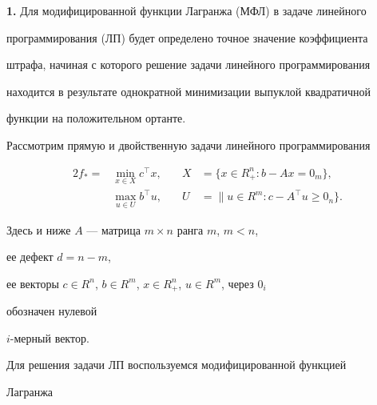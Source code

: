 \pagestyle{plain} %













\maketitle








{\bf 1.} Для модифицированной функции Лагранжа (МФЛ) в задаче линейного


программирования (ЛП) будет определено точное значение коэффициента


штрафа, начиная с которого решение задачи линейного программирования


находится в результате однократной минимизации выпуклой квадратичной


функции на положительном ортанте.





Рассмотрим прямую и двойственную задачи линейного программирования


\begin{alignat}{2}


f_*=& \min_{x\in X}c^\top x, &\quad X&=\{x\in R^n_+ :


b-Ax=0_m\},\\


& \max_{u\in U}b^\top u, &\quad U&=\|u\in R^m :


c-A^\top u\ge 0_n\}.


\end{alignat}


Здесь и ниже $A$ --- матрица $m\times n$ ранга $m$, $m<n$,


ее дефект $d=n-m$,


ее векторы $c\in R^n$, $b\in R^m$, $x\in R^n_+$, $u\in R^m$, через $0_i$


обозначен нулевой


$i$-мерный вектор.





Для решения задачи ЛП воспользуемся модифицированной функцией


Лагранжа


